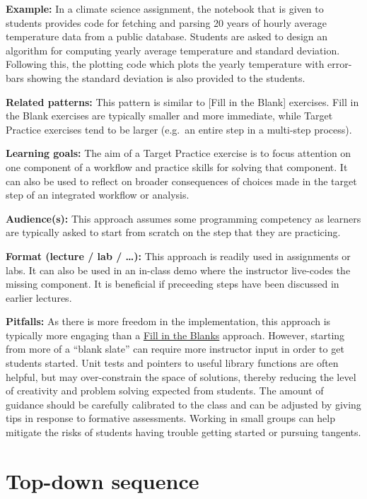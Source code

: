 \documentclass[]{book}
\begin{document}
\textbf{Example:} In a climate science assignment, the notebook that is
given to students provides code for fetching and parsing 20 years of
hourly average temperature data from a public database. Students are
asked to design an algorithm for computing yearly average temperature
and standard deviation. Following this, the plotting code which plots
the yearly temperature with error-bars showing the standard deviation is
also provided to the students.

\textbf{Related patterns:} This pattern is similar to {[}Fill in the
Blank{]} exercises. Fill in the Blank exercises are typically smaller
and more immediate, while Target Practice exercises tend to be larger
(e.g.~an entire step in a multi-step process).

\textbf{Learning goals:} The aim of a Target Practice exercise is to
focus attention on one component of a workflow and practice skills for
solving that component. It can also be used to reflect on broader
consequences of choices made in the target step of an integrated
workflow or analysis.

\textbf{Audience(s):} This approach assumes some programming competency
as learners are typically asked to start from scratch on the step that
they are practicing.

\textbf{Format (lecture / lab / \ldots{}):} This approach is readily
used in assignments or labs. It can also be used in an in-class demo
where the instructor live-codes the missing component. It is beneficial
if preceeding steps have been discussed in earlier lectures.

\textbf{Pitfalls:} As there is more freedom in the implementation, this
approach is typically more engaging than a
\protect\hyperlink{fill-in-the-blanks}{Fill in the Blanks} approach.
However, starting from more of a ``blank slate'' can require more
instructor input in order to get students started. Unit tests and
pointers to useful library functions are often helpful, but may
over-constrain the space of solutions, thereby reducing the level of
creativity and problem solving expected from students. The amount of
guidance should be carefully calibrated to the class and can be adjusted
by giving tips in response to formative assessments. Working in small
groups can help mitigate the risks of students having trouble getting
started or pursuing tangents.

\hypertarget{top-down-sequence}{\section{Top-down
sequence}\label{top-down-sequence}}
\end{document}
